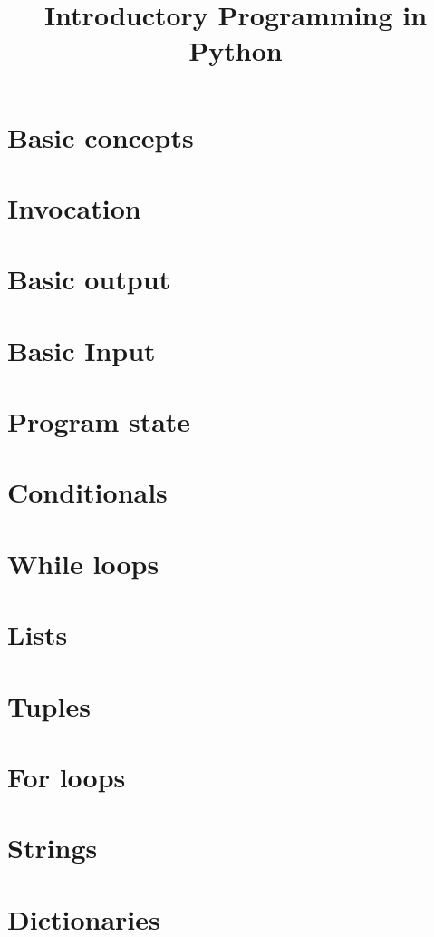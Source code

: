 \documentclass[a4paper,11pt]{report}
\title{Introductory Programming in Python}
\begin{document}
\maketitle
\chapter{Basic concepts}
    
\chapter{Invocation}
    
\chapter{Basic output}
    
\chapter{Basic Input}
    
\chapter{Program state}
    
\chapter{Conditionals}
    
\chapter{While loops}
    
\chapter{Lists}
    
\chapter{Tuples}
    
\chapter{For loops}
    
\chapter{Strings}
    
%    
\chapter{Dictionaries}
    
%    
%    
%    
%    
\end{document}
